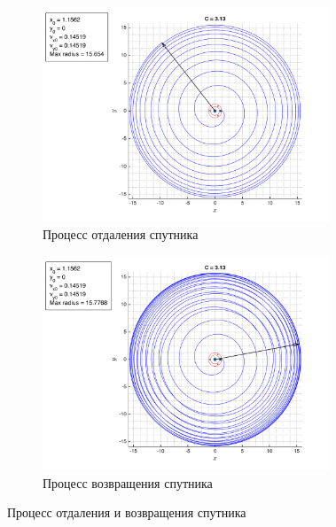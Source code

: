 \documentclass[a4paper,12pt]{article}
\begin{document}
\begin{figure}[h!]
	\centering
	\begin{subfigure}{.495\textwidth}
		\includegraphics[width=0.94\textwidth]{../../img/oscillator_1.png}
		\caption{Процесс отдаления спутника}
		\label{fig:oscillator_2}
	\end{subfigure}
	\begin{subfigure}{.495\textwidth}
		\includegraphics[width=0.94\textwidth]{../../img/oscillator_2.png}
		\caption{Процесс возвращения спутника}
		\label{fig:oscillator_1}
	\end{subfigure}
	\caption{Процесс отдаления и возвращения спутника}
	\label{fig:oscillator}
\end{figure}

\end{document}
